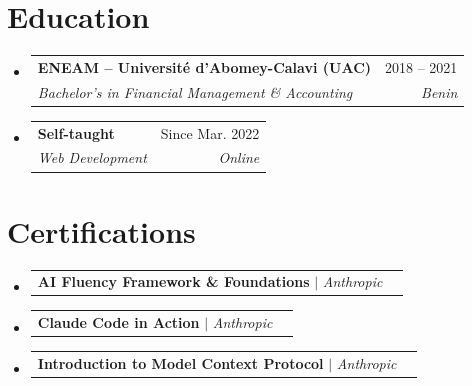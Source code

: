 \documentclass[letterpaper,11pt]{article}
\makeatletter
\newcommand{\resumeSubheading}[4]{
    \vspace{-2pt}\item
    \begin{tabular*}{0.97\textwidth}[t]{l@{\extracolsep{\fill}}r}
        \textbf{#1} & #2 \\
        \textit{\small#3} & \textit{\small #4} \\
    \end{tabular*}\vspace{-7pt}
}
\newcommand{\resumeProjectHeading}[2]{
    \item
    \begin{tabular*}{0.97\textwidth}{l@{\extracolsep{\fill}}r}
        \small#1 & #2 \\
    \end{tabular*}\vspace{-7pt}
}
\newcommand{\resumeSubHeadingListStart}{\begin{itemize}[leftmargin=0.15in, label={}]}
\newcommand{\resumeSubHeadingListEnd}{\end{itemize}}
\makeatother
\begin{document}
\section{Education}
\resumeSubHeadingListStart
    \resumeSubheading
        {ENEAM -- Universit\'{e} d'Abomey-Calavi (UAC)}{2018 -- 2021}
        {Bachelor's in Financial Management \& Accounting}{Benin}
    \resumeSubheading
        {Self-taught}{Since Mar. 2022}
        {Web Development}{Online}
\resumeSubHeadingListEnd

\section{Certifications}
\resumeSubHeadingListStart
    \resumeProjectHeading
        {\textbf{AI Fluency Framework \& Foundations} $|$ \emph{Anthropic}}{}
    \resumeProjectHeading
        {\textbf{Claude Code in Action} $|$ \emph{Anthropic}}{}
    \resumeProjectHeading
        {\textbf{Introduction to Model Context Protocol} $|$ \emph{Anthropic}}{}
\resumeSubHeadingListEnd

\end{document}
